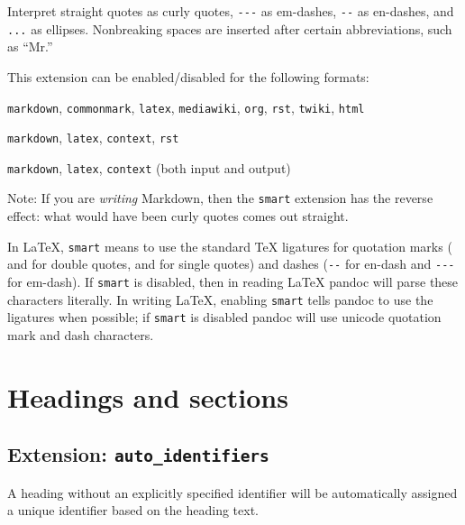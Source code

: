 \documentclass[
  b5paper
]{book}
\providecommand{\tightlist}{%
  \setlength{\itemsep}{0pt}\setlength{\parskip}{0pt}}
\begin{document}
Interpret straight quotes as curly quotes, \texttt{-\/-\/-} as
em-dashes, \texttt{-\/-} as en-dashes, and \texttt{...} as ellipses.
Nonbreaking spaces are inserted after certain abbreviations, such as
``Mr.''

This extension can be enabled/disabled for the following formats:

\begin{description}
\tightlist
\item[input formats]
\texttt{markdown}, \texttt{commonmark}, \texttt{latex},
\texttt{mediawiki}, \texttt{org}, \texttt{rst}, \texttt{twiki},
\texttt{html}
\item[output formats]
\texttt{markdown}, \texttt{latex}, \texttt{context}, \texttt{rst}
\item[enabled by default in]
\texttt{markdown}, \texttt{latex}, \texttt{context} (both input and
output)
\end{description}

Note: If you are \emph{writing} Markdown, then the \texttt{smart}
extension has the reverse effect: what would have been curly quotes
comes out straight.

In LaTeX, \texttt{smart} means to use the standard TeX ligatures for
quotation marks (\texttt{\textasciigrave{}\textasciigrave{}} and
\texttt{\textquotesingle{}\textquotesingle{}} for double quotes,
\texttt{\textasciigrave{}} and \texttt{\textquotesingle{}} for single
quotes) and dashes (\texttt{-\/-} for en-dash and \texttt{-\/-\/-} for
em-dash). If \texttt{smart} is disabled, then in reading LaTeX pandoc
will parse these characters literally. In writing LaTeX, enabling
\texttt{smart} tells pandoc to use the ligatures when possible; if
\texttt{smart} is disabled pandoc will use unicode quotation mark and
dash characters.

\section{Headings and sections}\label{headings-and-sections}

\subsection{\texorpdfstring{Extension:
\texttt{auto\_identifiers}}{Extension: auto\_identifiers}}\label{extension-auto_identifiers}

A heading without an explicitly specified identifier will be
automatically assigned a unique identifier based on the heading text.
\end{document}
